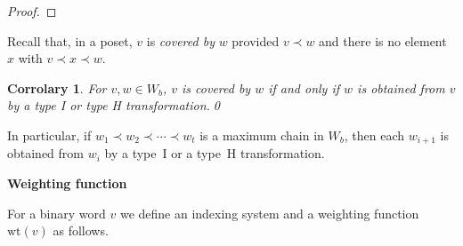 \documentclass[12pt]{article}
\DeclareMathOperator{\val}{val}
\newtheorem{corr}[conj]{Corrolary}
\newcommand{\barv}{\bar{v}}
\newcommand{\barw}{\bar{w}}
\newcommand{\weight}[1]{\mathrm{wt}(#1)}
\newcommand{\newthought}{%
  \smallskip\centerline{\rule{2in}{0.5pt}}\smallskip}
\begin{document}
\begin{proof}
\end{proof}



Recall that, in a poset, $v$ is \emph{covered by} $w$ provided $v
\prec w$ and there is no element $x$ with $v \prec x \prec w$. 


\begin{corr}
  For $v,w \in W_b$, $v$ is covered by $w$ if and only if $w$ is
  obtained from $v$ by a type I or type H transformation.\qed
\end{corr}

In particular, if $w_1 \prec w_2 \prec \cdots \prec w_t$ is a maximum
chain in $W_b$, then each $w_{i+1}$ is obtained from $w_i$ by a type~I
or a type~H transformation. 


\bigbreak
\noindent\textbf{Weighting function}

For a binary word $v$ we define an indexing system and a weighting
function $\weight v$ as follows.
\end{document}
